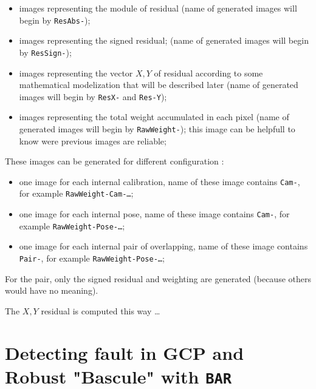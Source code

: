 \begin{itemize}
   \item images  representing the module of residual 
          (name of generated images will begin by {\tt ResAbs-});

   \item images  representing the signed residual;
          (name of generated images will begin by {\tt ResSign-});

   \item images  representing the vector $X,Y$ of residual according to some
         mathematical modelization that will be described later 
         (name of generated images will begin by {\tt ResX-} and {\tt Res-Y});

   \item images  representing the total weight accumulated in each pixel
          (name of generated images will begin by {\tt RawWeight-});
          this image can be helpfull to know were previous images are reliable;
   

\end{itemize}

These images can be generated for  different configuration :

\begin{itemize}
   \item one image for each internal calibration, name of these image contains {\tt Cam-},
         for example {\tt  RawWeight-Cam-\dots};

   \item one image for each internal pose, name of these image contains {\tt Cam-},
         for example {\tt  RawWeight-Pose-\dots};

   \item one image for each internal pair of overlapping, name of these image contains {\tt Pair-},
         for example {\tt  RawWeight-Pose-\dots};
\end{itemize}

For the pair, only the signed residual and weighting are generated (because others
would have no meaning).

The $X,Y$ residual is computed this way \dots 


\section{Detecting fault in GCP and  Robust "Bascule"  with {\tt BAR}}
\label{Sec:BAR}

